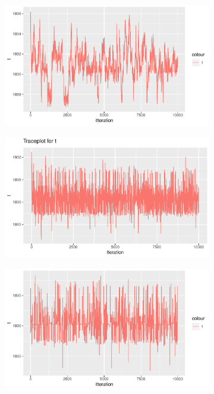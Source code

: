 \begin{figure}[h]
    \centering
    \begin{subfigure}[b]{0.49\textwidth}
        \centering
        \includegraphics[width = \textwidth]{Images/sim_t_sigma_03.pdf}
        \caption{}
        \label{fig:tuning_single_03}
    \end{subfigure}
    \begin{subfigure}[b]{0.49\textwidth}
        \centering
        \includegraphics[width = \textwidth]{Images/sim_t.pdf}
        \caption{}
        \label{fig:tuning_single_3}
    \end{subfigure}
    \begin{subfigure}[b]{0.49\textwidth}
        \centering
        \includegraphics[width = \textwidth]{Images/sim_t_sigma_15.pdf}

\end{subfigure}
\end{figure}

